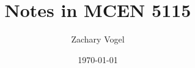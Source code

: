 \documentclass{article}
\author{Zachary Vogel}
\date{\today}
\title{Notes in MCEN 5115}
\begin{document}
\maketitle


\section*{}
\end{document}
